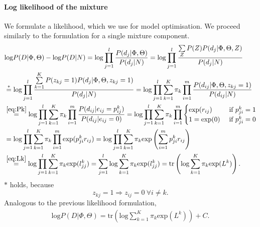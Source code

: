 \documentclass[12pt]{article}
\begin{document}
\paragraph{Log likelihood of the mixture}
We formulate a likelihood, which we use for model optimisation. We proceed similarly to the formulation for a single mixture component.
\begin{align}
&\mathrm{log}P(D| \Phi,\Theta) - \mathrm{log}P(D|N) = \mathrm{log} \prod\limits_{j=1}^l \frac{P(d_{j}|\Phi,\Theta)}{P(d_{j}|N)} = \mathrm{log} \prod\limits_{j=1}^l \frac{\sum\limits_Z P(Z) P(d_{j}|\Phi,\Theta, Z)}{P(d_{j}|N)}\nonumber\\
&\stackrel{*}{=} \mathrm{log} \prod\limits_{j=1}^l \frac{\sum\limits_{k=1}^K P(z_{kj} = 1) P(d_{j}|\Phi,\Theta, z_{kj} = 1)}{P(d_{j}|N)} = \mathrm{log} \prod\limits_{j=1}^l \sum\limits_{k=1}^K \pi_k \prod\limits_{i=1}^m \frac{P(d_{ij}|\Phi,\Theta, z_{kj} = 1)}{P(d_{ij}|N)}\nonumber\\
&\stackrel{\eqref{eq:Pk}}{=} \mathrm{log} \prod\limits_{j=1}^l \sum\limits_{k=1}^K \pi_k \prod\limits_{i=1}^m \frac{P(d_{ij}|e_{ij} = p^k_{ij})}{P(d_{ij}|e_{ij} = 0)} = \mathrm{log} \prod\limits_{j=1}^l \sum\limits_{k=1}^K \pi_k \prod\limits_{i=1}^m 
\begin{cases}
\mathrm{exp}(r_{ij}) &\text{ if } p_{ji}^k = 1\\
1 = \mathrm{exp}(0) &\text{ if } p_{ji}^k = 0\\
\end{cases}
\nonumber\\
&= \mathrm{log} \prod\limits_{j=1}^l \sum\limits_{k=1}^K \pi_k \prod\limits_{i=1}^m \mathrm{exp}(p_{ji}^k r_{ij}) = \mathrm{log} \prod\limits_{j=1}^l \sum\limits_{k=1}^K \pi_k \mathrm{exp}\left(\sum\limits_{i=1}^m p_{ji}^kr_{ij}\right)\nonumber\\
&\stackrel{\eqref{eq:Lk}}{=} \mathrm{log} \prod\limits_{j=1}^l \sum\limits_{k=1}^K \pi_k \mathrm{exp}(l^k_{jj}) = \sum\limits_{j=1}^l \mathrm{log} \sum\limits_{k=1}^K \pi_k \mathrm{exp}(l^k_{jj}) = \mathrm{tr}\left( \mathrm{log} \sum\limits_{k=1}^K \pi_k \mathrm{exp}(L^k) \right).
\end{align}
$*$ holds, because
\[z_{kj} = 1 \Rightarrow z_{ij} = 0 ~\forall i \neq k.\]
Analogous to the previous likelihood formulation,
\begin{align}\label{eq:logl}
\mathrm{log}P(D|\Phi,\Theta) = \mathrm{tr}\left( \mathrm{log} \sum\limits_{k=1}^K \pi_k \mathrm{exp}(L^k) \right) + C.
\end{align}
\end{document}
